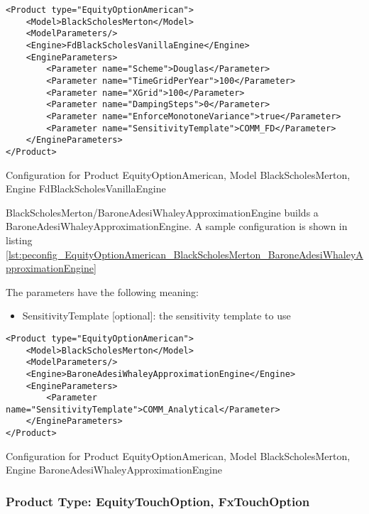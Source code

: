 \begin{longlisting}
\begin{verbatim}
<Product type="EquityOptionAmerican">
    <Model>BlackScholesMerton</Model>
    <ModelParameters/>
    <Engine>FdBlackScholesVanillaEngine</Engine>
    <EngineParameters>
        <Parameter name="Scheme">Douglas</Parameter>
        <Parameter name="TimeGridPerYear">100</Parameter>
        <Parameter name="XGrid">100</Parameter>
        <Parameter name="DampingSteps">0</Parameter>
        <Parameter name="EnforceMonotoneVariance">true</Parameter>
        <Parameter name="SensitivityTemplate">COMM_FD</Parameter>
    </EngineParameters>
</Product>
\end{verbatim}
\caption{Configuration for Product EquityOptionAmerican, Model BlackScholesMerton, Engine FdBlackScholesVanillaEngine}
\label{lst:peconfig_EquityOptionAmerican_BlackScholesMerton_FdBlackScholesVanillaEngine}
\end{longlisting}

BlackScholesMerton/BaroneAdesiWhaleyApproximationEngine builds a BaroneAdesiWhaleyApproximationEngine. A sample configuration is shown in listing
\ref{lst:peconfig_EquityOptionAmerican_BlackScholesMerton_BaroneAdesiWhaleyApproximationEngine}

The parameters have the following meaning:

\begin{itemize}
\item SensitivityTemplate [optional]: the sensitivity template to use 
\end{itemize}

\begin{longlisting}
\begin{verbatim}
<Product type="EquityOptionAmerican">
    <Model>BlackScholesMerton</Model>
    <ModelParameters/>
    <Engine>BaroneAdesiWhaleyApproximationEngine</Engine>
    <EngineParameters>
        <Parameter name="SensitivityTemplate">COMM_Analytical</Parameter>
    </EngineParameters>
</Product>
\end{verbatim}
\caption{Configuration for Product EquityOptionAmerican, Model BlackScholesMerton, Engine BaroneAdesiWhaleyApproximationEngine}
\label{lst:peconfig_EquityOptionAmerican_BlackScholesMerton_BaroneAdesiWhaleyApproximationEngine}
\end{longlisting}

\subsubsection{Product Type: EquityTouchOption, FxTouchOption}

